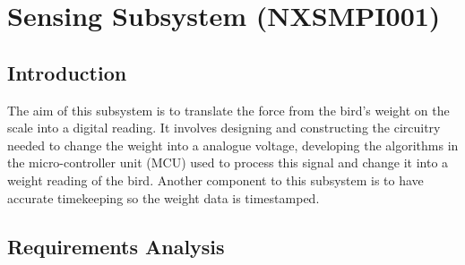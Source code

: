 \documentclass[class=report,11pt,crop=false]{standalone}
\begin{document}
	\chapter{Sensing Subsystem (NXSMPI001)}
	\vspace{0.5cm}
	\section{Introduction}
	The aim of this subsystem is to translate the force from the bird's weight on the scale into a digital reading. It involves designing and constructing the circuitry needed to change the weight into a analogue voltage, developing the algorithms in the micro-controller unit (MCU) used to process this signal and change it into a weight reading of the bird. Another component to this subsystem is to have accurate timekeeping so the weight data is timestamped. 
	
	\section{Requirements Analysis}
	\begin{table}[h!]
		\centering
		\caption{Non-functional Specifications of the Sensing Subsystem}
		\label{tab:S1}
	\end{table}
	
\end{document}
